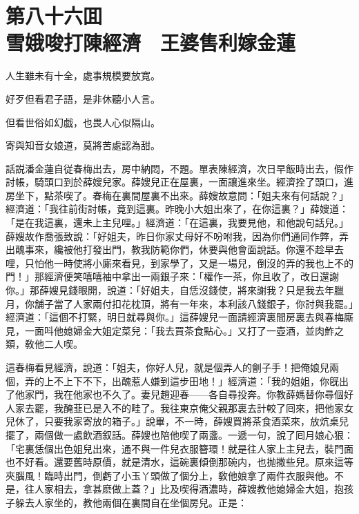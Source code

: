 
\chapter*{第八十六囬　\\雪娥唆打陳經濟　王婆售利嫁金蓮}


\begin{myquote}
人生雖未有十全，處事規模要放寬。

好歹但看君子語，是非休聽小人言。

但看世俗如幻戯，也畏人心似隔山。

寄與知音女娘道，莫將苦處認為甜。
\end{myquote}

話説潘金蓮自従春梅出去，房中納悶，不題。單表陳經濟，次日早飯時出去，假作討帳，騎頭口到於薛嫂兒家。薛嫂兒正在屋裏，一面讓進來坐。經濟拴了頭口，進房坐下，點茶喫了。春梅在裏間屋裏不出來。薛嫂故意問：「姐夫來有何話說？」經濟道：「我往前街討帳，竟到這裏。昨晚小大姐出來了，在你這裏？」薛嫂道：「是在我這裏，還未上主兒哩。」經濟道：「在這裏，我要見他，和他說句話兒。」薛嫂故作喬張致說：「好姐夫，昨日你家丈母好不吩咐我，因為你們通同作弊，弄出醜事來，纔被他打發出門，教我防範你們，休要與他會面說話。你還不趁早去哩，只怕他一時使將小廝來看見，到家學了，又是一場兒，倒沒的弄的我也上不的門！」那經濟便笑嘻嘻袖中拿出一兩銀子來：「權作一茶，你且收了，改日還謝你。」那薛嫂見錢眼開，說道：「好姐夫，自恁沒錢使，將來謝我？只是我去年臘月，你舖子當了人家兩付扣花枕頂，將有一年來，本利該八錢銀子，你討與我罷。」經濟道：「這個不打緊，明日就尋與你。」這薛嫂兒一面請經濟裏間房裏去與春梅廝見，一面呌他媳婦金大姐定菜兒：「我去買茶食點心。」又打了一壺酒，並肉鮓之類，敎他二人喫。

這春梅看見經濟，說道：「姐夫，你好人兒，就是個弄人的劊子手！把俺娘兒兩個，弄的上不上下不下，出醜惹人嫌到這步田地！」經濟道：「我的姐姐，你旣出了他家門，我在他家也不久了。妻兒趙迎春——各自尋投奔。你教薛媽替你尋個好人家去罷，我醃韮已是入不的畦了。我往東京俺父親那裏去計較了囘來，把他家女兒休了，只要我家寄放的箱子。」說畢，不一時，薛嫂買將茶食酒菜來，放炕桌兒擺了，兩個做一處飲酒叙話。薛嫂也陪他喫了兩盞。一遞一句，說了囘月娘心狠：「宅裏恁個出色姐兒出來，通不與一件兒衣服簪環！就是往人家上主兒去，裝門面也不好看。還要舊時原價，就是清水，這碗裏傾倒那碗内，也抛撒些兒。原來這等夾腦風！臨時出門，倒虧了小玉丫頭做了個分上，敎他娘拿了兩件衣服與他。不是，往人家相去，拿甚麽做上蓋？」比及喫得酒濃時，薛嫂教他媳婦金大姐，抱孩子躲去人家坐的，教他兩個在裏間自在坐個房兒。正是：

